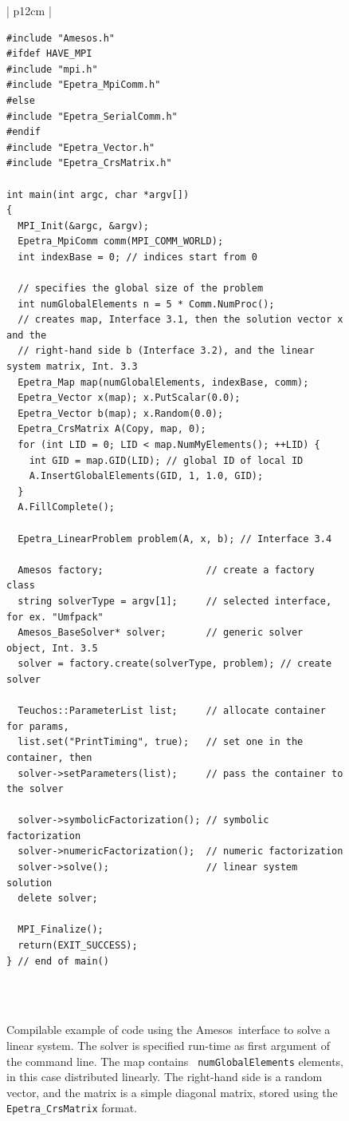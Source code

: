 \documentclass[acmtoms,acmnow]{acmtrans2m}
\newcommand{\amesos}{{\sc Amesos}}
\begin{document}
\begin{figure}
\begin{center}
\begin{tabular}{| p{12cm} | }
\hline
 \\
\begin{minipage}{12cm}
\begin{verbatim}
#include "Amesos.h"
#ifdef HAVE_MPI
#include "mpi.h"
#include "Epetra_MpiComm.h"
#else
#include "Epetra_SerialComm.h"
#endif
#include "Epetra_Vector.h"
#include "Epetra_CrsMatrix.h"

int main(int argc, char *argv[])
{
  MPI_Init(&argc, &argv);
  Epetra_MpiComm comm(MPI_COMM_WORLD);
  int indexBase = 0; // indices start from 0

  // specifies the global size of the problem
  int numGlobalElements n = 5 * Comm.NumProc();
  // creates map, Interface 3.1, then the solution vector x and the
  // right-hand side b (Interface 3.2), and the linear system matrix, Int. 3.3
  Epetra_Map map(numGlobalElements, indexBase, comm);
  Epetra_Vector x(map); x.PutScalar(0.0);
  Epetra_Vector b(map); x.Random(0.0);
  Epetra_CrsMatrix A(Copy, map, 0);
  for (int LID = 0; LID < map.NumMyElements(); ++LID) {
    int GID = map.GID(LID); // global ID of local ID
    A.InsertGlobalElements(GID, 1, 1.0, GID);
  }
  A.FillComplete();

  Epetra_LinearProblem problem(A, x, b); // Interface 3.4

  Amesos factory;                  // create a factory class
  string solverType = argv[1];     // selected interface, for ex. "Umfpack"
  Amesos_BaseSolver* solver;       // generic solver object, Int. 3.5
  solver = factory.create(solverType, problem); // create solver

  Teuchos::ParameterList list;     // allocate container for params,
  list.set("PrintTiming", true);   // set one in the container, then
  solver->setParameters(list);     // pass the container to the solver

  solver->symbolicFactorization(); // symbolic factorization
  solver->numericFactorization();  // numeric factorization
  solver->solve();                 // linear system solution
  delete solver;

  MPI_Finalize();
  return(EXIT_SUCCESS);
} // end of main()
\end{verbatim}
\end{minipage} \\
 \\
 \hline
\end{tabular}
\caption{Compilable example of code using the \amesos\ interface
  to solve a linear system. The solver is specified run-time as first
argument of the command line. The map contains {\tt
numGlobalElements} elements, in this case distributed linearly. The
right-hand side is a random vector, and the matrix is a simple
diagonal matrix, stored using the {\tt Epetra\_CrsMatrix} format. }
\label{fig:example}
\end{center}
\end{figure}
\end{document}
